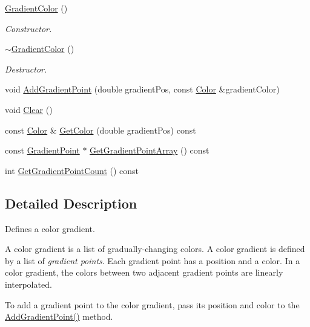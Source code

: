 \begin{DoxyCompactItemize}
\hyperlink{classnoise_1_1utils_1_1_gradient_color_af302d241e27c11c3f864a0b5368196d3}{Gradient\+Color} ()
\begin{DoxyCompactList}\small\item\em Constructor. \end{DoxyCompactList}\item 
\hyperlink{classnoise_1_1utils_1_1_gradient_color_a7bc79f04663e2a6948fa359ed822682f}{$\sim$\+Gradient\+Color} ()
\begin{DoxyCompactList}\small\item\em Destructor. \end{DoxyCompactList}\item 
void \hyperlink{classnoise_1_1utils_1_1_gradient_color_a961e65225ac07622d6138a35f71c3801}{Add\+Gradient\+Point} (double gradient\+Pos, const \hyperlink{classnoise_1_1utils_1_1_color}{Color} \&gradient\+Color)
\item 
void \hyperlink{classnoise_1_1utils_1_1_gradient_color_a1d59cb7ed0a1601331a66d50c83d6a64}{Clear} ()
\item 
const \hyperlink{classnoise_1_1utils_1_1_color}{Color} \& \hyperlink{classnoise_1_1utils_1_1_gradient_color_a979a2490e26a6831e1067989199fd003}{Get\+Color} (double gradient\+Pos) const 
\item 
const \hyperlink{structnoise_1_1utils_1_1_gradient_point}{Gradient\+Point} $\ast$ \hyperlink{classnoise_1_1utils_1_1_gradient_color_a3679d2455b1b73f7e25f80609fa90820}{Get\+Gradient\+Point\+Array} () const 
\item 
int \hyperlink{classnoise_1_1utils_1_1_gradient_color_a5755924714ac89914b339f3addc80741}{Get\+Gradient\+Point\+Count} () const 
\end{DoxyCompactItemize}


\subsection{Detailed Description}
Defines a color gradient.

A color gradient is a list of gradually-\/changing colors. A color gradient is defined by a list of {\itshape gradient points}. Each gradient point has a position and a color. In a color gradient, the colors between two adjacent gradient points are linearly interpolated.

To add a gradient point to the color gradient, pass its position and color to the \hyperlink{classnoise_1_1utils_1_1_gradient_color_ac715c443ee7e6456657d131ab0cac42a}{Add\+Gradient\+Point()} method.

